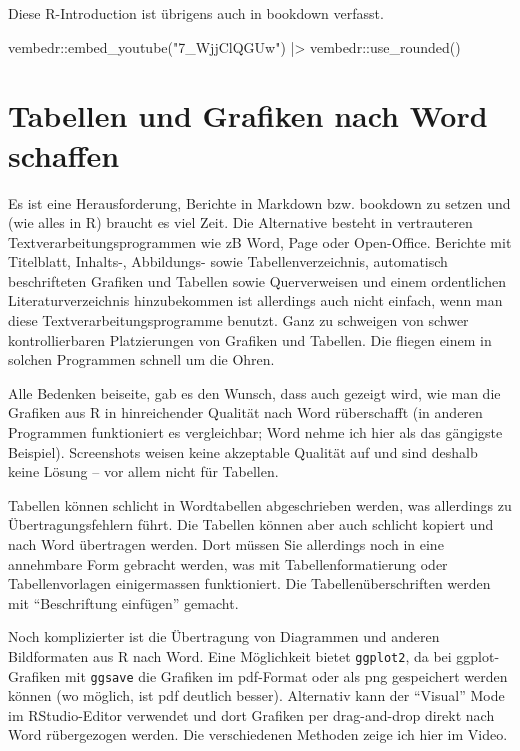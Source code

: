 \documentclass[twoside, pagesize, fontsize=11pt, dvipsnames]{scrreport}
\newenvironment{Shaded}{\begin{snugshade}}{\end{snugshade}}
\newcommand{\FunctionTok}[1]{\textcolor[rgb]{0.28,0.35,0.67}{#1}}
\newcommand{\NormalTok}[1]{\textcolor[rgb]{0.00,0.23,0.31}{#1}}
\newcommand{\SpecialCharTok}[1]{\textcolor[rgb]{0.37,0.37,0.37}{#1}}
\newcommand{\StringTok}[1]{\textcolor[rgb]{0.13,0.47,0.30}{#1}}
\begin{document}
Diese R-Introduction ist übrigens auch in bookdown verfasst.

\begin{Shaded}
\begin{Highlighting}[]
\NormalTok{vembedr}\SpecialCharTok{::}\FunctionTok{embed\_youtube}\NormalTok{(}\StringTok{"7\_WjjClQGUw"}\NormalTok{) }\SpecialCharTok{|\textgreater{}} 
\NormalTok{  vembedr}\SpecialCharTok{::}\FunctionTok{use\_rounded}\NormalTok{()}
\end{Highlighting}
\end{Shaded}

\hypertarget{tabellen-und-grafiken-nach-word-schaffen}{%
\section{Tabellen und Grafiken nach Word
schaffen}\label{tabellen-und-grafiken-nach-word-schaffen}}

Es ist eine Herausforderung, Berichte in Markdown bzw. bookdown zu
setzen und (wie alles in R) braucht es viel Zeit. Die Alternative
besteht in vertrauteren Textverarbeitungsprogrammen wie zB Word, Page
oder Open-Office. Berichte mit Titelblatt, Inhalts-, Abbildungs- sowie
Tabellenverzeichnis, automatisch beschrifteten Grafiken und Tabellen
sowie Querverweisen und einem ordentlichen Literaturverzeichnis
hinzubekommen ist allerdings auch nicht einfach, wenn man diese
Textverarbeitungsprogramme benutzt. Ganz zu schweigen von schwer
kontrollierbaren Platzierungen von Grafiken und Tabellen. Die fliegen
einem in solchen Programmen schnell um die Ohren.

Alle Bedenken beiseite, gab es den Wunsch, dass auch gezeigt wird, wie
man die Grafiken aus R in hinreichender Qualität nach Word rüberschafft
(in anderen Programmen funktioniert es vergleichbar; Word nehme ich hier
als das gängigste Beispiel). Screenshots weisen keine akzeptable
Qualität auf und sind deshalb keine Lösung -- vor allem nicht für
Tabellen.

Tabellen können schlicht in Wordtabellen abgeschrieben werden, was
allerdings zu Übertragungsfehlern führt. Die Tabellen können aber auch
schlicht kopiert und nach Word übertragen werden. Dort müssen Sie
allerdings noch in eine annehmbare Form gebracht werden, was mit
Tabellenformatierung oder Tabellenvorlagen einigermassen funktioniert.
Die Tabellenüberschriften werden mit \enquote{Beschriftung einfügen}
gemacht.

Noch komplizierter ist die Übertragung von Diagrammen und anderen
Bildformaten aus R nach Word. Eine Möglichkeit bietet \texttt{ggplot2},
da bei ggplot-Grafiken mit \texttt{ggsave} die Grafiken im pdf-Format
oder als png gespeichert werden können (wo möglich, ist pdf deutlich
besser). Alternativ kann der \enquote{Visual} Mode im RStudio-Editor
verwendet und dort Grafiken per drag-and-drop direkt nach Word
rübergezogen werden. Die verschiedenen Methoden zeige ich hier im Video.
\end{document}
